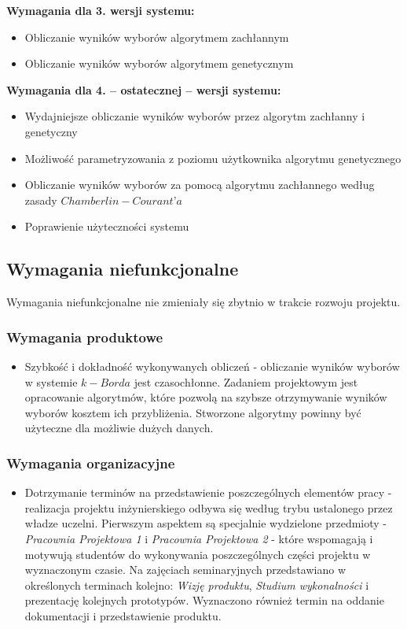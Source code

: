 \documentclass[pdflatex,11pt]{../aghdoc_version2}
\begin{document}
\textbf{Wymagania dla 3. wersji systemu:}
\begin{itemize}
\item Obliczanie wyników wyborów algorytmem zachłannym
\item Obliczanie wyników wyborów algorytmem genetycznym
\end{itemize}
\vspace{\baselineskip}
\textbf{Wymagania dla 4. – ostatecznej – wersji systemu:}
\begin{itemize}
\item Wydajniejsze obliczanie wyników wyborów przez algorytm zachłanny i genetyczny
\item Możliwość parametryzowania z poziomu użytkownika algorytmu genetycznego
\item Obliczanie wyników wyborów za pomocą algorytmu zachłannego
według zasady $Chamberlin-Courant’a$
\item Poprawienie użyteczności systemu
\end{itemize}

\subsection{Wymagania niefunkcjonalne}
Wymagania niefunkcjonalne nie zmieniały się zbytnio w trakcie rozwoju projektu.

\subsubsection{Wymagania produktowe}
\begin{itemize}
\item Szybkość i dokładność wykonywanych obliczeń - obliczanie wyników wyborów w
systemie $k-Borda$ jest czasochłonne. Zadaniem projektowym jest opracowanie
algorytmów, które pozwolą na szybsze otrzymywanie wyników wyborów kosztem ich
przybliżenia. Stworzone algorytmy powinny być użyteczne dla możliwie dużych
danych.
\end{itemize}

\subsubsection{Wymagania organizacyjne}
\begin{itemize}
\item Dotrzymanie terminów na przedstawienie poszczególnych elementów pracy -
realizacja projektu inżynierskiego odbywa się według trybu ustalonego przez władze
uczelni. Pierwszym aspektem są specjalnie wydzielone przedmioty - \textit{Pracownia
Projektowa 1} i \textit{Pracownia Projektowa 2} - które wspomagają i motywują studentów
do wykonywania poszczególnych części projektu w wyznaczonym czasie. Na
zajęciach seminaryjnych przedstawiano w określonych terminach kolejno: \textit{Wizję
produktu}, \textit{Studium wykonalności} i prezentację kolejnych prototypów. Wyznaczono
również termin na oddanie dokumentacji i przedstawienie produktu.
\end{itemize}
\end{document}
